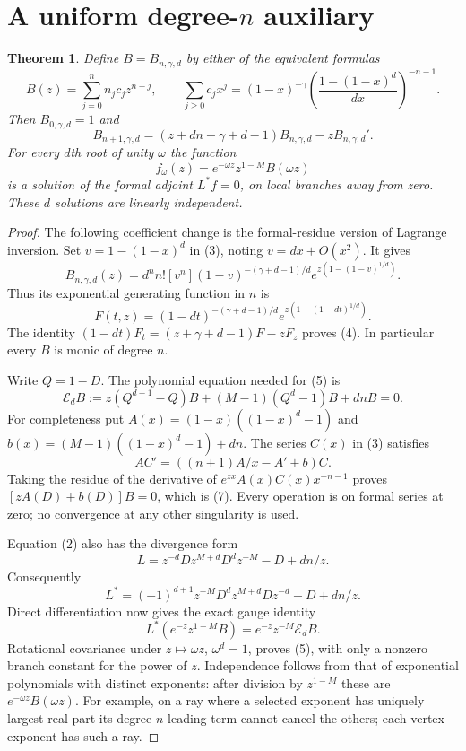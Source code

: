 \documentclass[11pt]{article}
\newtheorem{theorem}{Theorem}
\begin{document}
\section{A uniform degree-$n$ auxiliary}
\begin{theorem}\label{thm:aux}
Define $B=B_{n,\gamma,d}$ by either of the equivalent formulas
\[
 B(z)=\sum_{j=0}^n n_{\underline j}c_jz^{n-j},\qquad
 \sum_{j\ge0}c_jx^j=(1-x)^{-\gamma}
 \left(\frac{1-(1-x)^d}{dx}\right)^{-n-1}.                    \tag{3}
\]
Then $B_{0,\gamma,d}=1$ and
\[
 B_{n+1,\gamma,d}=(z+dn+\gamma+d-1)B_{n,\gamma,d}
                                  -zB_{n,\gamma,d}'.          \tag{4}
\]
For every $d$th root of unity $\omega$ the function
\[
 f_\omega(z)=e^{-\omega z}z^{1-M}B(\omega z)                   \tag{5}
\]
is a solution of the formal adjoint $L^*f=0$, on local branches away
from zero. These $d$ solutions are linearly independent.
\end{theorem}
\begin{proof}
The following coefficient change is the formal-residue version of
Lagrange inversion. Set $v=1-(1-x)^d$ in (3), noting $v=dx+O(x^2)$.
It gives
\[
 B_{n,\gamma,d}(z)=d^n n![v^n](1-v)^{-(\gamma+d-1)/d}
                       e^{z(1-(1-v)^{1/d})}.                 \tag{6}
\]
Thus its exponential generating function in $n$ is
\[
 F(t,z)=(1-dt)^{-(\gamma+d-1)/d}
                    e^{z(1-(1-dt)^{1/d})}.
\]
The identity $(1-dt)F_t=(z+\gamma+d-1)F-zF_z$ proves (4).
In particular every $B$ is monic of degree $n$.

Write $Q=1-D$. The polynomial equation needed for (5) is
\[
 \mathcal E_d B:=z(Q^{d+1}-Q)B+(M-1)(Q^d-1)B+dnB=0.        \tag{7}
\]
For completeness put
$A(x)=(1-x)((1-x)^d-1)$ and
$b(x)=(M-1)((1-x)^d-1)+dn$.
The series $C(x)$ in (3) satisfies
\[
 A C'=((n+1)A/x-A'+b)C.
\]
Taking the residue of the derivative of
$e^{zx}A(x)C(x)x^{-n-1}$ proves
$[zA(D)+b(D)]B=0$, which is (7). Every operation is on formal series
at zero; no convergence at any other singularity is used.

Equation (2) also has the divergence form
\[
 L=z^{-d}D z^{M+d}D^d z^{-M}-D+dn/z.
\]
Consequently
\[
 L^*=(-1)^{d+1}z^{-M}D^d z^{M+d}D z^{-d}+D+dn/z.
\]
Direct differentiation now gives the exact gauge identity
\[
 L^*(e^{-z}z^{1-M}B)=e^{-z}z^{-M}\mathcal E_dB.               \tag{8}
\]
Rotational covariance under $z\mapsto\omega z$, $\omega^d=1$,
proves (5), with only a nonzero branch constant for the power of $z$.
Independence follows from that of exponential polynomials with distinct
exponents: after division by $z^{1-M}$ these are
$e^{-\omega z}B(\omega z)$. For example, on a ray where a selected
exponent has uniquely largest real part its degree-$n$ leading term
cannot cancel the others; each vertex exponent has such a ray.
\end{proof}
\end{document}
